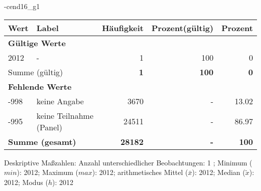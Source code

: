                 \vspace*{-\baselineskip}
					\begin{filecontents}{\jobname-cend16_g1}
					\begin{longtable}{lXrrr}
					\toprule
					\textbf{Wert} & \textbf{Label} & \textbf{Häufigkeit} & \textbf{Prozent(gültig)} & \textbf{Prozent} \\
					\endhead
					\midrule
					\multicolumn{5}{l}{\textbf{Gültige Werte}}\\

					2012 &
					\multicolumn{1}{X}{ -  } &


					  \num{1} &
					  \num[round-mode=places,round-precision=2]{100} &
					    \num[round-mode=places,round-precision=2]{0} \\
					\midrule
					\multicolumn{2}{l}{Summe (gültig)} &
					  \textbf{\num{1}} &
					\textbf{\num{100}} &
					  \textbf{\num[round-mode=places,round-precision=2]{0}} \\
					\multicolumn{5}{l}{\textbf{Fehlende Werte}}\\
							-998 &
							keine Angabe &
							  \num{3670} &
							 - &
							  \num[round-mode=places,round-precision=2]{13.02} \\
							-995 &
							keine Teilnahme (Panel) &
							  \num{24511} &
							 - &
							  \num[round-mode=places,round-precision=2]{86.97} \\
					\midrule
					\multicolumn{2}{l}{\textbf{Summe (gesamt)}} &
				      \textbf{\num{28182}} &
				    \textbf{-} &
				    \textbf{\num{100}} \\
					\bottomrule
					\end{longtable}
					\end{filecontents}
				\label{tableValues:cend16_g1}
				\vspace*{-\baselineskip}
                    \begin{noten}
                	    \note{} Deskriptive Maßzahlen:
                	    Anzahl unterschiedlicher Beobachtungen: 1%
                	    ; 
                	      Minimum ($min$): 2012; 
                	      Maximum ($max$): 2012; 
                	      arithmetisches Mittel ($\bar{x}$): \num[round-mode=places,round-precision=2]{2012}; 
                	      Median ($\tilde{x}$): 2012; 
                	      Modus ($h$): 2012
                     \end{noten}

